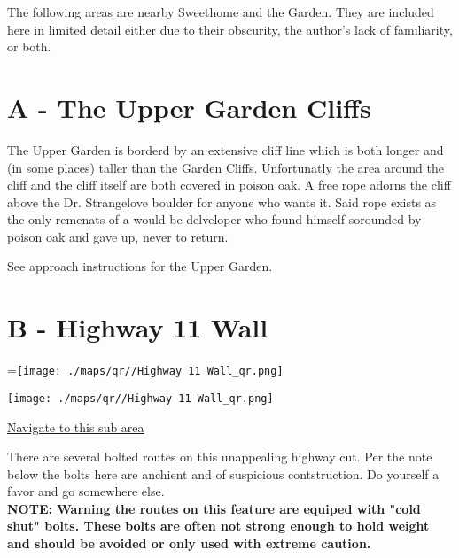 \raggedcolumns
\begin{multicols}{2}


The following areas are nearby Sweethome and the Garden. They are included here in limited detail either due to their obscurity, the author's lack of familiarity, or both.\\



\needspace{6em}

\section{A - The Upper Garden Cliffs}\label{sa:The Upper Garden Cliffs}

The Upper Garden is borderd by an extensive cliff line which is both longer and (in some places) taller than the Garden Cliffs. Unfortunatly the area around the cliff and the cliff itself are both covered in poison oak. A free rope adorns the cliff above the Dr. Strangelove boulder for anyone who wants it. Said rope exists as the only remenats of a would be delveloper who found himself sorounded by poison oak and gave up, never to return.

See approach instructions for the Upper Garden.\\




\needspace{6em}

\section{B - Highway 11 Wall}\label{sa:Highway 11 Wall}
=\hbox{\texttt{[image: ./maps/qr//Highway 11 Wall\_qr.png]}}%
\begin{center}
\texttt{[image: ./maps/qr//Highway 11 Wall\_qr.png]}
\end{center}
\begin{center}
\underline{\textcolor{blue}{\href{http://maps.google.com/maps?q=44.45543296270457,-122.54719340682593}{Navigate to this sub area}}}
\end{center}


There are several bolted routes on this unappealing highway cut. Per the note below the bolts here are anchient and of suspicious contstruction. Do yourself a favor and go somewhere else.\\
\textbf{NOTE: Warning the routes on this feature are equiped with "cold shut" bolts. These bolts are often not strong enough to hold weight and should be avoided or only used with extreme caution.}\\





\end{multicols}
